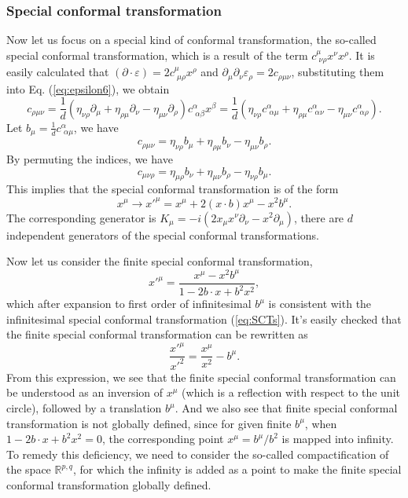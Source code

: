 \documentclass[graybox,envcountchap,sectrefs]{svmono}
\begin{document}
\subsubsection*{Special conformal transformation}
Now let us focus on a special kind of conformal transformation, the so-called special conformal transformation, which is a result of the term $c^{\mu}_{\,\,\nu\rho}x^{\nu}x^{\rho}$. It is easily calculated that $(\partial \cdot \varepsilon)=2c^{\mu}_{\,\,\mu\rho}x^{\rho}$ and $\partial_{\mu}\partial_{\nu}\varepsilon_{\rho}=2c_{\rho\mu\nu}$, substituting them into Eq. (\ref{eq:epsilon6}), we obtain
\[
c_{\rho\mu\nu}=\frac{1}{d}(\eta_{\nu\rho}\partial_{\mu}+\eta_{\rho\mu}\partial_{\nu}-\eta_{\mu\nu}\partial_{\rho})c^{\alpha}_{\,\,\alpha\beta}x^{\beta}=\frac{1}{d}(\eta_{\nu\rho}c^{\alpha}_{\,\,\alpha\mu}+\eta_{\rho\mu}c^{\alpha}_{\,\,\alpha\nu}-\eta_{\mu\nu}c^{\alpha}_{\,\,\alpha\rho}).
\]
Let $b_{\mu}=\frac{1}{d}c^{\alpha}_{\,\,\alpha\mu}$, we have
\[
c_{\rho\mu\nu}=\eta_{\nu\rho}b_{\mu}+\eta_{\rho\mu}b_{\nu}-\eta_{\mu\nu}b_{\rho}.
\]
By permuting the indices, we have
\begin{equation}
\boxed{
c_{\mu\nu\rho}=\eta_{\mu\rho}b_{\nu}+\eta_{\mu\nu}b_{\rho}-\eta_{\nu\rho}b_{\mu}.
}
\end{equation}
This implies that the special conformal transformation is of the form
\begin{equation} \label{eq:SCTs}
\boxed{
x^{\mu}\to x'^{\mu}=x^{\mu}+2(x\cdot b)x^{\mu}-x^2b^{\mu}.
}
\end{equation}
The corresponding generator is $K_{\mu}=-i(2x_{\mu}x^{\nu}\partial_{\nu}-x^2 \partial_{\mu})$, there are $d$ independent generators of the special conformal transformations.

Now let us consider the finite special conformal transformation, 
\begin{equation}
{x'}^{\mu}=\frac{x^{\mu}-x^2b^{\mu}}{1-2b\cdot x+b^2x^2},
\end{equation}
which after expansion to first order of infinitesimal $b^{\mu}$ is consistent with the infinitesimal special conformal transformation (\ref{eq:SCTs}). It's easily checked that the finite special conformal transformation can be rewritten as
\begin{equation}
\frac{{x'}^{\mu}}{{x'}^2}=\frac{{x}^{\mu}}{{x}^2}-b^{\mu}.
\end{equation}
From this expression, we see that the finite special conformal transformation can be understood as an inversion of $x^{\mu}$ (which is a reflection with respect to the unit circle), followed by a translation $b^{\mu}$. And we also see that finite special conformal transformation is not globally defined, since for given finite $b^{\mu}$, when $1-2b\cdot x+b^2x^2=0$, the corresponding point $x^{\mu}=b^{\mu}/b^2$ is mapped into infinity. To remedy this deficiency, we need to consider the so-called compactification of the space $\mathbb{R}^{p,q}$, for which the infinity is added as a point to make the finite special conformal transformation globally defined.
\end{document}
